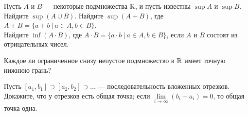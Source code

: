 \documentclass[a4paper, 11pt]{article}
\begin{document}


 Пусть $A$ и $B$ --- некоторые подмножества $\mathbb{R}$,
и пусть известны $\sup A$ и $\sup B$.\\
 Найдите $\sup (A \cup B)$. \quad
{} Найдите $\sup (A+B)$,
где $A+B = \{ a+b\ |\ a\in A, b\in B\}$.\\ %
 Найдите $\inf(A\cdot B)$, где
$A\cdot B=\{ a\cdot b\ |\ a\in A, b\in B\}$,
если $A$ и $B$ состоят из отрицательных чисел.

\smallskip
{}

\smallskip

Каждое ли ограниченное снизу непустое подмножество в $\mathbb{R}$
имеет точную нижнюю грань?




 Пусть
$
[a_1,b_1]\supset [a_2,b_2] \supset \dots
$
--- последовательность вложенных отрезков. Докажите, что
 у отрезков есть общая точка;
 если $\lim\limits_{i\to\infty} (b_i-a_i) = 0$,
то общая точка %
одна.
\end{document}
